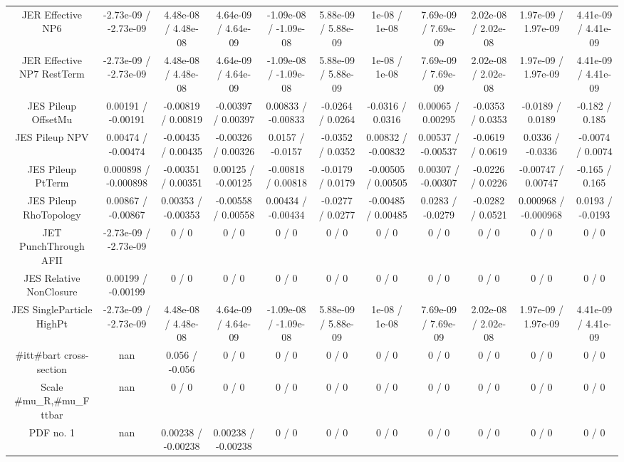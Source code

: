 \begin{table}[htbp]
\begin{center}
\begin{tabular}{|c|c|c|c|c|c|c|c|c|c|c|}
  JER Effective NP6 & -2.73e-09 / -2.73e-09 & 4.48e-08 / 4.48e-08 & 4.64e-09 / 4.64e-09 & -1.09e-08 / -1.09e-08 & 5.88e-09 / 5.88e-09 & 1e-08 / 1e-08 & 7.69e-09 / 7.69e-09 & 2.02e-08 / 2.02e-08 & 1.97e-09 / 1.97e-09 & 4.41e-09 / 4.41e-09 \\ 
  JER Effective NP7 RestTerm & -2.73e-09 / -2.73e-09 & 4.48e-08 / 4.48e-08 & 4.64e-09 / 4.64e-09 & -1.09e-08 / -1.09e-08 & 5.88e-09 / 5.88e-09 & 1e-08 / 1e-08 & 7.69e-09 / 7.69e-09 & 2.02e-08 / 2.02e-08 & 1.97e-09 / 1.97e-09 & 4.41e-09 / 4.41e-09 \\ 
  JES Pileup OffsetMu & 0.00191 / -0.00191 & -0.00819 / 0.00819 & -0.00397 / 0.00397 & 0.00833 / -0.00833 & -0.0264 / 0.0264 & -0.0316 / 0.0316 & 0.00065 / 0.00295 & -0.0353 / 0.0353 & -0.0189 / 0.0189 & -0.182 / 0.185 \\ 
  JES Pileup NPV & 0.00474 / -0.00474 & -0.00435 / 0.00435 & -0.00326 / 0.00326 & 0.0157 / -0.0157 & -0.0352 / 0.0352 & 0.00832 / -0.00832 & 0.00537 / -0.00537 & -0.0619 / 0.0619 & 0.0336 / -0.0336 & -0.0074 / 0.0074 \\ 
  JES Pileup PtTerm & 0.000898 / -0.000898 & -0.00351 / 0.00351 & 0.00125 / -0.00125 & -0.00818 / 0.00818 & -0.0179 / 0.0179 & -0.00505 / 0.00505 & 0.00307 / -0.00307 & -0.0226 / 0.0226 & -0.00747 / 0.00747 & -0.165 / 0.165 \\ 
  JES Pileup RhoTopology & 0.00867 / -0.00867 & 0.00353 / -0.00353 & -0.00558 / 0.00558 & 0.00434 / -0.00434 & -0.0277 / 0.0277 & -0.00485 / 0.00485 & 0.0283 / -0.0279 & -0.0282 / 0.0521 & 0.000968 / -0.000968 & 0.0193 / -0.0193 \\ 
  JET PunchThrough AFII & -2.73e-09 / -2.73e-09 & 0 / 0 & 0 / 0 & 0 / 0 & 0 / 0 & 0 / 0 & 0 / 0 & 0 / 0 & 0 / 0 & 0 / 0 \\ 
  JES Relative NonClosure & 0.00199 / -0.00199 & 0 / 0 & 0 / 0 & 0 / 0 & 0 / 0 & 0 / 0 & 0 / 0 & 0 / 0 & 0 / 0 & 0 / 0 \\ 
  JES SingleParticle HighPt & -2.73e-09 / -2.73e-09 & 4.48e-08 / 4.48e-08 & 4.64e-09 / 4.64e-09 & -1.09e-08 / -1.09e-08 & 5.88e-09 / 5.88e-09 & 1e-08 / 1e-08 & 7.69e-09 / 7.69e-09 & 2.02e-08 / 2.02e-08 & 1.97e-09 / 1.97e-09 & 4.41e-09 / 4.41e-09 \\ 
  #it{t#bar{t}} cross-section &    nan    & 0.056 / -0.056 & 0 / 0 & 0 / 0 & 0 / 0 & 0 / 0 & 0 / 0 & 0 / 0 & 0 / 0 & 0 / 0 \\ 
  Scale #mu_{R},#mu_{F} ttbar &    nan    & 0 / 0 & 0 / 0 & 0 / 0 & 0 / 0 & 0 / 0 & 0 / 0 & 0 / 0 & 0 / 0 & 0 / 0 \\ 
  PDF no. 1 &    nan    & 0.00238 / -0.00238 & 0.00238 / -0.00238 & 0 / 0 & 0 / 0 & 0 / 0 & 0 / 0 & 0 / 0 & 0 / 0 & 0 / 0 \\ 

\end{tabular}
\end{center}
\end{table}
